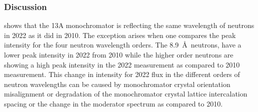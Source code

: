 
\subsubsection{Discussion}

 shows that the 13A monochromator is reflecting the same wavelength of neutrons in 2022 as it did in 2010. The exception arises when one compares the peak intensity for the four neutron wavelength orders. The 8.9~\AA\ neutrons, have a lower peak intensity in 2022 from 2010 while the higher order neutrons are showing a high peak intensity in the 2022 measurement as compared to 2010 measurement. This change in intensity for 2022 flux in the different orders of neutron wavelengths can be caused by monochromator crystal orientation misalignment or degradation of the monochromator crystal lattice intercalation spacing or the change in the moderator spectrum as compared to 2010.

